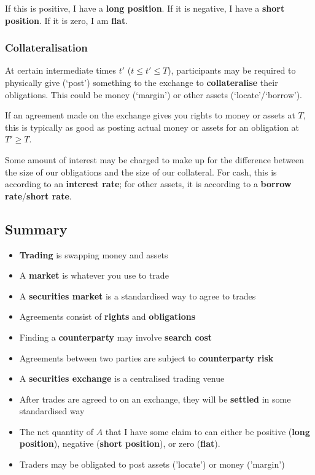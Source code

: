 \documentclass{article}
\begin{document}
If this is positive, I have a \textbf{long position}. If it is negative, I have a \textbf{short position}. If it is zero, I am \textbf{flat}.

\subsubsection{Collateralisation}
At certain intermediate times $t'$ ($t\leq t'\leq T$), participants may be required to physically give (`post') something to the exchange to \textbf{collateralise} their obligations. This could be money (`margin') or other assets (`locate'/`borrow').

If an agreement made on the exchange gives you rights to money or assets at $T$, this is typically as good as posting actual money or assets for an obligation at $T'\geq T$.

Some amount of interest may be charged to make up for the difference between the size of our obligations and the size of our collateral. For cash, this is according to an \textbf{interest rate}; for other assets, it is according to a \textbf{borrow rate}/\textbf{short rate}.

\subsection{Summary}
\begin{itemize}
	\item \textbf{Trading} is swapping money and assets
	\item A \textbf{market} is whatever you use to trade
	\item A \textbf{securities market} is a standardised way to agree to trades
	\item Agreements consist of \textbf{rights} and \textbf{obligations}
	\item Finding a \textbf{counterparty} may involve \textbf{search cost}
	\item Agreements between two parties are subject to \textbf{counterparty risk}
	\item A \textbf{securities exchange} is a centralised trading venue %
	\item After trades are agreed to on an exchange, they will be \textbf{settled} in some standardised way
	\item The net quantity of $A$ that I have some claim to can either be positive (\textbf{long position}), negative (\textbf{short position}), or zero (\textbf{flat}).
	\item Traders may be obligated to post assets ('locate') or money ('margin')
\end{itemize}
\end{document}
